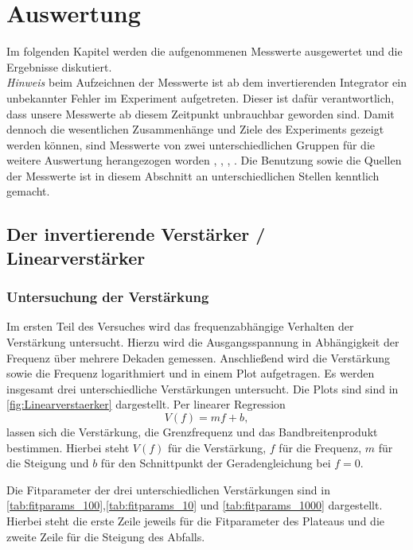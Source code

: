 \newpage
\section{Auswertung}
Im folgenden Kapitel werden die aufgenommenen Messwerte ausgewertet und die Ergebnisse 
diskutiert.\\
\textit{Hinweis} beim Aufzeichnen der Messwerte ist ab dem invertierenden Integrator
ein unbekannter Fehler im Experiment aufgetreten. Dieser ist dafür verantwortlich, dass
unsere Messwerte ab diesem Zeitpunkt unbrauchbar geworden sind.
Damit dennoch die wesentlichen Zusammenhänge und Ziele des Experiments gezeigt werden können,
sind Messwerte von zwei unterschiedlichen Gruppen für die weitere Auswertung herangezogen worden
\cite{schmitt}, \cite{signal}, \cite{int_data}, \cite{int_picture}.
Die Benutzung sowie die Quellen der Messwerte
ist in diesem Abschnitt an unterschiedlichen Stellen kenntlich gemacht.

\subsection{Der invertierende Verstärker / Linearverstärker}
\subsubsection{Untersuchung der Verstärkung}
Im ersten Teil des Versuches wird das frequenzabhängige Verhalten der Verstärkung untersucht.
Hierzu wird die Ausgangsspannung in Abhängigkeit der Frequenz über mehrere Dekaden gemessen. 
Anschließend wird die Verstärkung sowie die Frequenz logarithmiert und in einem Plot aufgetragen.
Es werden insgesamt drei unterschiedliche Verstärkungen untersucht.
Die Plots sind sind in \autoref{fig:Linearverstaerker} dargestellt.
Per linearer Regression
\begin{equation}
    V(f) = m f + b,
    \label{eq:linReg}
\end{equation}
lassen sich die Verstärkung, die Grenzfrequenz und das Bandbreitenprodukt bestimmen.
Hierbei steht $V(f)$ für die Verstärkung, $f$ für die Frequenz, $m$ für die Steigung
und $b$ für den Schnittpunkt der Geradengleichung bei $f = 0$.

Die Fitparameter der drei unterschiedlichen Verstärkungen sind in 
\autoref{tab:fitparams_100},\autoref{tab:fitparams_10} und \autoref{tab:fitparams_1000}
dargestellt.
Hierbei steht die erste Zeile jeweils für die Fitparameter des Plateaus und 
die zweite Zeile für die Steigung des Abfalls.



\FloatBarrier


